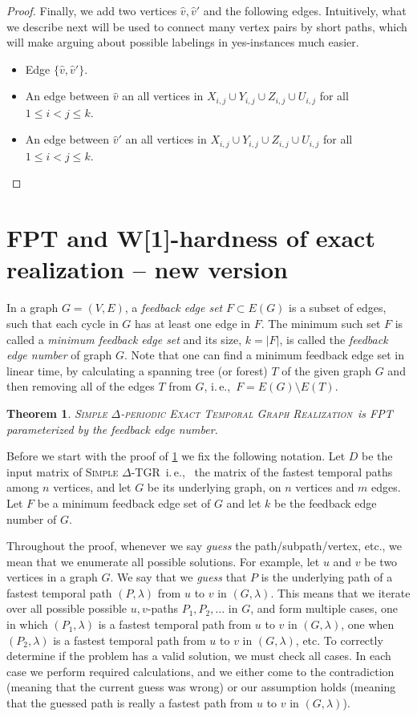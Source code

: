 \documentclass[11pt,a4paper]{article}
\newtheorem{theorem}{Theorem}
\theoremstyle{remark}
\theoremstyle{definition}
\newcommand{\ie}{i.\,e.,\ }
\newcommand{\deltaExactLong}{\textsc{Simple $\Delta$-periodic Exact Temporal Graph Realization}}
\newcommand{\deltaExact}{\textsc{Simple $\Delta$-TGR}}
\begin{document}
\begin{proof}
    Finally, we add two vertices $\hat{v},\hat{v}'$ and the following edges. Intuitively, what we describe next will be used to connect many vertex pairs by short paths, which will make arguing about possible labelings in yes-instances much easier.
    \begin{itemize}
        \item Edge $\{\hat{v},\hat{v}'\}$.
        \item An edge between $\hat{v}$ an all vertices in $X_{i,j}\cup Y_{i,j} \cup Z_{i,j}\cup U_{i,j}$ for all $1\le i<j\le k$.
        \item An edge between $\hat{v}'$ an all vertices in $X_{i,j}\cup Y_{i,j} \cup Z_{i,j}\cup U_{i,j}$ for all $1\le i<j\le k$.
    \end{itemize}
\end{proof}

\section{FPT and W[1]-hardness of exact realization -- new version}
In a graph $G=(V,E)$, a \emph{feedback edge set} $F \subset E(G)$ is a subset of edges, such that each cycle in $G$ has at least one edge in $F$.
The minimum such set $F$ is called a  \emph{minimum feedback edge set} and its size, $k = |F|$, is called the \emph{feedback edge number} of graph $G$.
Note that one can find a minimum feedback edge set in linear time, by calculating a spanning tree (or forest) $T$ of the given graph $G$ and then removing all of the edges $T$ from $G$, \ie $F = E(G) \setminus E(T)$.

\begin{theorem}\label{thm:FPTwrtFES}
    \deltaExactLong\ is FPT parameterized by the feedback edge number.
\end{theorem}

Before we start with the proof of \cref{thm:FPTwrtFES} we fix the following notation. 
Let $D$ be the input matrix of \deltaExact\ \ie
the matrix of the fastest temporal paths among $n$ vertices, and let $G$ be its underlying graph, on $n$ vertices and $m$ edges.
Let $F$ be a minimum feedback edge set of $G$ and let $k$ be the feedback edge number of $G$.

Throughout the proof, whenever we say \emph{guess} the path/subpath/vertex, etc., we mean that we enumerate all possible solutions.
For example, let $u$ and $v$ be two vertices in a graph $G$. 
We say that we \emph{guess} that $P$ is the underlying path of a fastest temporal path $(P, \lambda)$ from $u$ to $v$ in $(G, \lambda)$.
This means that we iterate over all possible possible $u,v$-paths $P_1, P_2, \dots $ in $G$, 
and form multiple cases, 
one in which $(P_1, \lambda)$ is a fastest temporal path from $u$ to $v$ in $(G,\lambda)$,
one when $(P_2, \lambda)$ is a fastest temporal path from $u$ to $v$ in $(G,\lambda)$, etc.
To correctly determine if the problem has a valid solution, we must check all cases.
In each case we perform required calculations, 
and we either come to the contradiction (meaning that the current guess was wrong) 
or our assumption holds (meaning that the guessed path is really a fastest path from $u$ to $v$ in $(G, \lambda)$).
\end{document}
